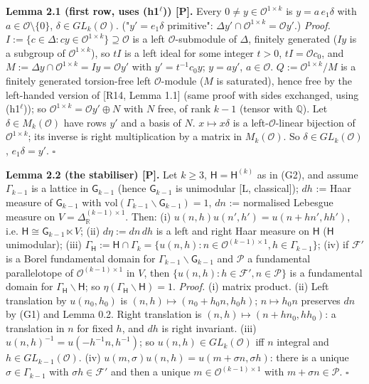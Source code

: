 \textbf{Lemma 2.1 (first row, uses (h1\(^\ell\))) {[}P{]}.} Every \(0\ne y\in\mathcal O^{1\times k}\) is \(y=a\,e_1\delta\) with \(a\in\mathcal O\setminus\{0\}\), \(\delta\in GL_k(\mathcal O)\). ("\(y'=e_1\delta\) primitive": \(\Delta y'\cap\mathcal O^{1\times k}=\mathcal Oy'\).)
\emph{Proof.} \(I:=\{c\in\Delta:cy\in\mathcal O^{1\times k}\}\supseteq\mathcal O\) is a left \(\mathcal O\)-submodule of \(\Delta\), finitely generated (\(Iy\) is a subgroup of \(\mathcal O^{1\times k}\)), so \(tI\) is a left ideal for some integer \(t>0\), \(tI=\mathcal Oc_0\), and \(M:=\Delta y\cap\mathcal O^{1\times k}=Iy=\mathcal Oy'\) with \(y'=t^{-1}c_0y\); \(y=ay'\), \(a\in\mathcal O\). \(Q:=\mathcal O^{1\times k}/M\) is a finitely generated torsion-free left \(\mathcal O\)-module (\(M\) is saturated), hence free by the left-handed version of {[}R14, Lemma 1.1{]} (same proof with sides exchanged, using (h1\(^\ell\))); so \(\mathcal O^{1\times k}=\mathcal Oy'\oplus N\) with \(N\) free, of rank \(k-1\) (tensor with \(\mathbb Q\)). Let \(\delta\in M_k(\mathcal O)\) have rows \(y'\) and a basis of \(N\). \(x\mapsto x\delta\) is a left-\(\mathcal O\)-linear bijection of \(\mathcal O^{1\times k}\); its inverse is right multiplication by a matrix in \(M_k(\mathcal O)\). So \(\delta\in GL_k(\mathcal O)\), \(e_1\delta=y'\). \(\square\)

\textbf{Lemma 2.2 (the stabiliser) {[}P{]}.} Let \(k\ge3\), \(\mathsf H=\mathsf H^{(k)}\) as in (G2), and assume \(\Gamma_{k-1}\) is a lattice in \(\mathsf G_{k-1}\) (hence \(\mathsf G_{k-1}\) is unimodular {[}L, classical{]}); \(dh\) := Haar measure of \(\mathsf G_{k-1}\) with \(\mathrm{vol}(\Gamma_{k-1}\backslash\mathsf G_{k-1})=1\), \(dn\) := normalised Lebesgue measure on \(V=\Delta_{\mathbb R}^{(k-1)\times1}\). Then: (i) \(u(n,h)u(n',h')=u(n+hn',hh')\), i.e. \(\mathsf H\cong\mathsf G_{k-1}\ltimes V\); (ii) \(d\eta:=dn\,dh\) is a left and right Haar measure on \(\mathsf H\) (\(\mathsf H\) unimodular); (iii) \(\Gamma_{\mathsf H}:=\mathsf H\cap\Gamma_k=\{u(n,h):n\in\mathcal O^{(k-1)\times1},h\in\Gamma_{k-1}\}\); (iv) if \(\mathcal F'\) is a Borel fundamental domain for \(\Gamma_{k-1}\backslash\mathsf G_{k-1}\) and \(\mathcal P\) a fundamental parallelotope of \(\mathcal O^{(k-1)\times1}\) in \(V\), then \(\{u(n,h):h\in\mathcal F',n\in\mathcal P\}\) is a fundamental domain for \(\Gamma_{\mathsf H}\backslash\mathsf H\); so \(\eta(\Gamma_{\mathsf H}\backslash\mathsf H)=1\).
\emph{Proof.} (i) matrix product. (ii) Left translation by \(u(n_0,h_0)\) is \((n,h)\mapsto(n_0+h_0n,h_0h)\); \(n\mapsto h_0n\) preserves \(dn\) by (G1) and Lemma 0.2. Right translation is \((n,h)\mapsto(n+hn_0,hh_0)\): a translation in \(n\) for fixed \(h\), and \(dh\) is right invariant. (iii) \(u(n,h)^{-1}=u(-h^{-1}n,h^{-1})\); so \(u(n,h)\in GL_k(\mathcal O)\) iff \(n\) integral and \(h\in GL_{k-1}(\mathcal O)\). (iv) \(u(m,\sigma)u(n,h)=u(m+\sigma n,\sigma h)\): there is a unique \(\sigma\in\Gamma_{k-1}\) with \(\sigma h\in\mathcal F'\) and then a unique \(m\in\mathcal O^{(k-1)\times1}\) with \(m+\sigma n\in\mathcal P\). \(\square\)

